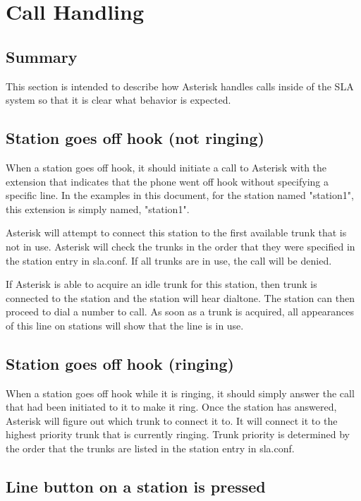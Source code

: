 \section{Call Handling}
\subsection{Summary}

This section is intended to describe how Asterisk handles calls inside of the
SLA system so that it is clear what behavior is expected.

\subsection{Station goes off hook (not ringing)}

When a station goes off hook, it should initiate a call to Asterisk with the
extension that indicates that the phone went off hook without specifying a
specific line.  In the examples in this document, for the station named
"station1", this extension is simply named, "station1".

Asterisk will attempt to connect this station to the first available trunk
that is not in use.  Asterisk will check the trunks in the order that they
were specified in the station entry in sla.conf.  If all trunks are in use,
the call will be denied.

If Asterisk is able to acquire an idle trunk for this station, then trunk
is connected to the station and the station will hear dialtone.  The station
can then proceed to dial a number to call.  As soon as a trunk is acquired,
all appearances of this line on stations will show that the line is in use.

\subsection{Station goes off hook (ringing)}

When a station goes off hook while it is ringing, it should simply answer
the call that had been initiated to it to make it ring.  Once the station
has answered, Asterisk will figure out which trunk to connect it to.  It
will connect it to the highest priority trunk that is currently ringing.
Trunk priority is determined by the order that the trunks are listed in
the station entry in sla.conf.

\subsection{Line button on a station is pressed}

